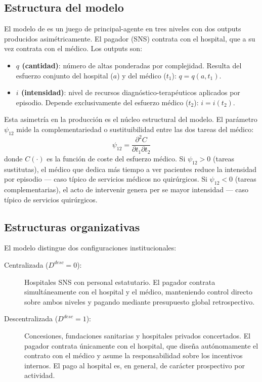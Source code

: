 \documentclass[12pt, a4paper]{article}
\begin{document}
\subsection{Estructura del modelo}

El modelo de \citet{izquierdo2019} es un juego de
principal-agente en tres niveles con dos outputs
producidos asimétricamente. El pagador (SNS) contrata
con el hospital, que a su vez contrata con el médico.
Los outputs son:

\begin{itemize}
  \item \textbf{$q$ (cantidad)}: número de altas
    ponderadas por complejidad. Resulta del esfuerzo
    conjunto del hospital ($a$) y del médico ($t_1$):
    $q = q(a, t_1)$.
  \item \textbf{$i$ (intensidad)}: nivel de recursos
    diagnóstico-terapéuticos aplicados por episodio.
    Depende exclusivamente del esfuerzo médico ($t_2$):
    $i = i(t_2)$.
\end{itemize}

Esta asimetría en la producción es el núcleo estructural
del modelo. El parámetro $\psi_{12}$ mide la
complementariedad o sustituibilidad entre las dos tareas
del médico:
\begin{equation}
  \psi_{12} = \frac{\partial^2 C}{\partial t_1 \partial t_2}
  \label{eq:psi12}
\end{equation}
donde $C(\cdot)$ es la función de coste del esfuerzo
médico. Si $\psi_{12} > 0$ (tareas sustitutas), el médico
que dedica más tiempo a ver pacientes reduce la
intensidad por episodio --- caso típico de servicios
médicos no quirúrgicos. Si $\psi_{12} < 0$ (tareas
complementarias), el acto de intervenir genera per se
mayor intensidad --- caso típico de servicios quirúrgicos.

\subsection{Estructuras organizativas}

El modelo distingue dos configuraciones institucionales:

\begin{description}
  \item[Centralizada ($D^{desc} = 0$):] Hospitales SNS
    con personal estatutario. El pagador contrata
    simultáneamente con el hospital y el médico, manteniendo
    control directo sobre ambos niveles y pagando mediante
    presupuesto global retrospectivo.
  \item[Descentralizada ($D^{desc} = 1$):] Concesiones,
    fundaciones sanitarias y hospitales privados
    concertados. El pagador contrata únicamente con el
    hospital, que diseña autónomamente el contrato con el
    médico y asume la responsabilidad sobre los incentivos
    internos. El pago al hospital es, en general, de
    carácter prospectivo por actividad.
\end{description}
\end{document}
